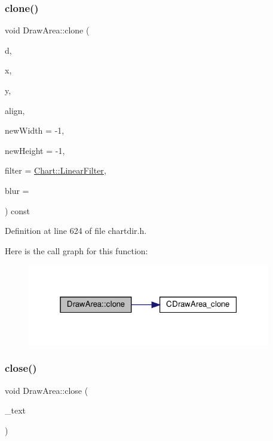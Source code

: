 \subsubsection{\texorpdfstring{clone()}{clone()}}
{\footnotesize\ttfamily void Draw\+Area\+::clone (\begin{DoxyParamCaption}\item[{\hyperlink{class_draw_area}{Draw\+Area} $\ast$}]{d,  }\item[{int}]{x,  }\item[{int}]{y,  }\item[{int}]{align,  }\item[{int}]{new\+Width = {\ttfamily -\/1},  }\item[{int}]{new\+Height = {\ttfamily -\/1},  }\item[{int}]{filter = {\ttfamily \hyperlink{namespace_chart_ab75b9aa1781d0e0159ef1d441b577764a8cd729b7a982bac2dce8b021511e3ac6}{Chart\+::\+Linear\+Filter}},  }\item[{double}]{blur = {} }\end{DoxyParamCaption}) const\hspace{0.3cm}{\ttfamily [inline]}}



Definition at line 624 of file chartdir.\+h.

Here is the call graph for this function\+:
\nopagebreak
\begin{figure}[H]
\begin{center}
\leavevmode
\includegraphics[width=301pt]{class_draw_area_af2045d87f9eecf5b6649361cf1598ae3_cgraph}
\end{center}
\end{figure}
\mbox{\label{class_draw_area_af8f45b9c5fa29730b43267eda865b10a}} 
\subsubsection{\texorpdfstring{close()}{close()}}
{\footnotesize\ttfamily void Draw\+Area\+::close (\begin{DoxyParamCaption}\item[{\hyperlink{class_t_t_f_text}{T\+T\+F\+Text} $\ast$}]{\+\_\+text }\end{DoxyParamCaption})\hspace{0.3cm}{\ttfamily [inline]}}



